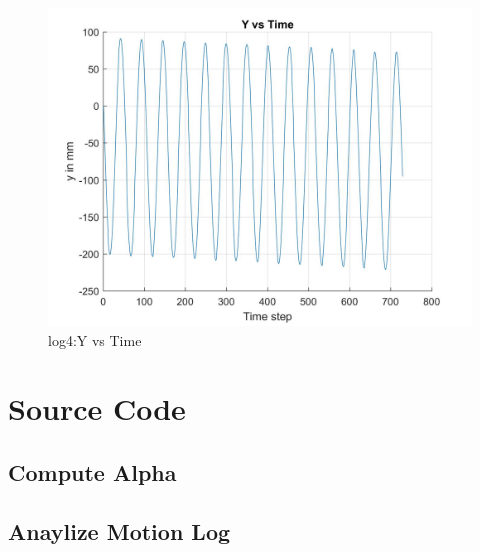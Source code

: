 \documentclass[paper=a4, fontsize=11pt]{scrartcl} %
\numberwithin{equation}{section} %
\numberwithin{figure}{section} %
\numberwithin{table}{section} %
\begin{document}
\begin{appendix}
\begin{figure}[H]
	\centering
	\includegraphics[width = 0.6\linewidth]{./figures/log4/yVsTime.jpg}
	\caption{log4:Y vs Time}
\end{figure}


\section{Source Code}
\subsection{Compute Alpha}

\subsection{Anaylize Motion Log}

\end{appendix}
\end{document}
